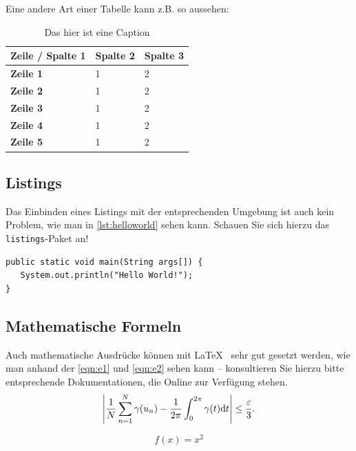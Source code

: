 Eine andere Art einer Tabelle kann z.B. so aussehen: 
\begin{table}[h!]
	\centering
	\begin{tabularx}{\textwidth}{|l|X|X|}
		\hline
		\textbf{Zeile / Spalte 1} & \textbf{Spalte 2} & \textbf{Spalte 3} \\
		\hline
		\textbf{Zeile 1} & 1 & 2 \\ \hline
		\textbf{Zeile 2} & 1 & 2  \\ \hline
		\textbf{Zeile 3} & 1 & 2  \\ \hline
		\textbf{Zeile 4} & 1 & 2  \\ \hline
		\textbf{Zeile 5} & 1 & 2  \\ \hline
	\end{tabularx}
	\caption{Das hier ist eine Caption \protect{}}
	\label{tab:label1}
\end{table}

\subsection{Listings}	

Das Einbinden eines Listings mit der entsprechenden Umgebung ist auch kein Problem, wie man in \autoref{lst:helloworld} sehen kann. Schauen Sie sich hierzu das \texttt{listings}-Paket an! 
		
\lstset{language=Java}
\begin{lstlisting}[caption={Hello World!}, label={lst:helloworld}]
public static void main(String args[]) {
   System.out.println("Hello World!");
}
\end{lstlisting}

\subsection{Mathematische Formeln}
Auch mathematische Ausdrücke können mit \LaTeX~ sehr gut gesetzt werden, wie man anhand der \autoref{eqn:e1} und \autoref{eqn:e2} sehen kann -- konsultieren Sie hierzu bitte entsprechende Dokumentationen, die Online zur Verfügung stehen.
\begin{equation}
\left|{1\over N}\sum_{n=1}^N \gamma(u_n)-{1\over 2\pi}\int_0^{2\pi}\gamma(t){\rm d}t\right| \le {\varepsilon\over 3}.\\
\label{eqn:e1}
\end{equation}

\begin{equation}
f(x)=x^2
\label{eqn:e2}
\end{equation}

